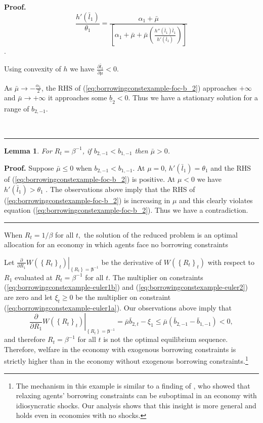 \documentclass[thmsb,11pt]{article}
\newtheorem{lemma}{Lemma}
\newenvironment{proof}[1][Proof]{\noindent \textbf{#1.} }{\  \rule{0.5em}{0.5em}}
\begin{document}
\begin{appendix}
\begin{proof}
 \[\frac{h'(\bar{l}_1)}{\theta_1}=\frac{\alpha_1+\bar{\mu}}{\left[\alpha_1+\bar{\mu}+\bar{\mu}\left(\frac{h''(\bar{l}_1)\bar{l}_1}{h'(\bar{l}_1)}\right)\right]}\].

 Using convexity of $h$ we have $\frac{\partial \bar{l}_1}{\partial \mu}<0$.

 As $\bar{\mu}\to -\frac{\alpha_1}{2}$, the RHS of (\ref{eq:borrowingconstexample-foc-b_2}) approaches $+\infty$ and $\bar{\mu}\to + \infty$ it approaches some $\underline{b}_2<0$. Thus we have a stationary solution for a range of $b_{2,-1}$.

\end{proof}

\begin{lemma}
 For $R_t=\beta^{-1}$, if $b_{2,-1}<b_{1,-1}$ then $\bar{\mu}>0$.
\end{lemma}
\begin{proof}
 Suppose $\bar{\mu}\leq0$ when $b_{2,-1}<b_{1,-1}$.  At $\mu=0$, $h'(\bar{l}_1)=\theta_1$  and the RHS of (\ref{eq:borrowingconstexample-foc-b_2}) is positive.  At $\mu<0$ we have $h'(\bar{l}_1)>\theta_1$ . The observations above imply that the RHS of (\ref{eq:borrowingconstexample-foc-b_2}) is increasing in $\mu$ and this clearly violates equation (\ref{eq:borrowingconstexample-foc-b_2}).  Thus we have a contradiction.
 \end{proof}
\smallskip

When $R_{t}=1/\beta $ for all $t,$
the solution of the reduced problem is an optimal allocation for an economy
in which agents face no borrowing constraints

Let $\left. \frac{\partial }{\partial R_{1}}W\left( \left \{ R_{t}\right \}
_{t}\right) \right \vert _{\left \{ R_{t}\right \} =\bm{\beta }^{-1}}$
be the derivative of $W\left( \left \{ R_{t}\right \} _{t}\right) $ with
respect to $R_{1}$ evaluated at $R_{t}=\beta ^{-1}$ for all $t$. The multiplier on constraints  (\ref{eq:borrowingconstexample-euler1b}) and (\ref{eq:borrowingconstexample-euler2}) are zero and let $\xi_t\geq0$ be the multiplier on constraint (\ref{eq:borrowingconstexample-euler1a}). Our
observations above imply that
\begin{equation*}
\left. \frac{\partial }{\partial R_{1}}W\left( \left \{ R_{t}\right \}
_{t}\right) \right \vert _{\left \{ R_{t}\right \} =\bm{\beta }^{-1}}=%
\bar{\mu}\bar{b}_{2,t}-\xi_1\leq\bar{\mu}\left( \bar{b}_{2,-1}-\bar{b}%
_{1,-1}\right) <0,
\end{equation*}
and therefore $R_{t}=\beta ^{-1}$ for all $t$ is not the optimal equilibrium
sequence. Therefore, welfare in the economy with exogenous borrowing
constraints is strictly higher than in the economy without exogenous
borrowing constraints.\footnote{%
The mechanism in this example is similar to a finding of \cite{Yared2012}, who
showed that relaxing agents' borrowing constraints can be suboptimal in an
economy with idiosyncratic shocks. Our analysis shows that this insight is
more general and holds even in economies with no shocks.}


\end{appendix}
\end{document}
